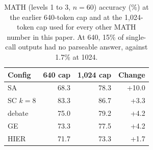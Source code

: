 \begin{table}[t]\centering\small
\caption{MATH (levels 1 to 3, $n{=}60$) accuracy (\%) at the earlier 640-token cap and at the 1{,}024-token cap used for every other MATH number in this paper. At 640, 15\% of single-call outputs had no parseable answer, against 1.7\% at 1024.}
\label{tab:trunc}
\begin{tabular}{lrrr}
\toprule
Config & 640 cap & 1{,}024 cap & Change \\
\midrule
SA & 68.3 & 78.3 & +10.0 \\
SC $k{=}8$ & 83.3 & 86.7 & +3.3 \\
debate & 75.0 & 79.2 & +4.2 \\
GE & 73.3 & 77.5 & +4.2 \\
HIER & 71.7 & 73.3 & +1.7 \\
\bottomrule
\end{tabular}
\end{table}
